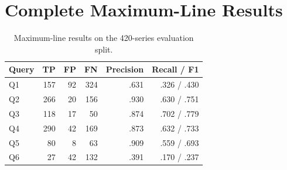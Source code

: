\section{Complete Maximum-Line Results}

\begin{table}[H]
\centering
\small
\caption{Maximum-line results on the 420-series evaluation split.}
\begin{tabular}{lrrrrr}
\toprule
Query & TP & FP & FN & Precision & Recall / F1 \\
\midrule
Q1 & 157 & 92 & 324 & .631 & .326 / .430 \\
Q2 & 266 & 20 & 156 & .930 & .630 / .751 \\
Q3 & 118 & 17 & 50 & .874 & .702 / .779 \\
Q4 & 290 & 42 & 169 & .873 & .632 / .733 \\
Q5 & 80 & 8 & 63 & .909 & .559 / .693 \\
Q6 & 27 & 42 & 132 & .391 & .170 / .237 \\
\bottomrule
\end{tabular}
\end{table}


